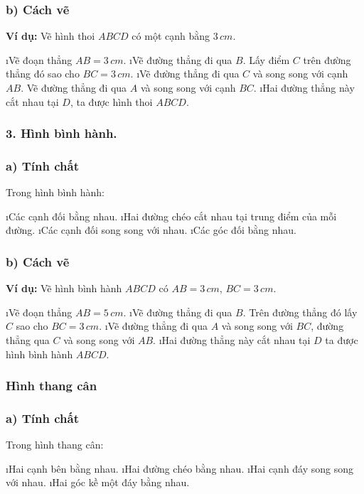 \subsubsection*{b) Cách vẽ}
\textbf{Ví dụ:} Vẽ hình thoi $ABCD$ có một cạnh bằng $3\, cm$. 
\begin{enumerate}[Bước 1:, leftmargin=*]
	\i Vẽ đoạn thẳng $AB = 3\, cm$. 
	\i Vẽ đường thẳng đi qua $B$. Lấy điểm $C$ trên đường thẳng đó sao cho $BC = 3\, cm$. 
	\i Vẽ đường thẳng đi qua $C$  và song song với cạnh $AB$. Vẽ đường thẳng đi qua $A$ và song song với cạnh $BC$. 
	\i Hai đường thẳng này cắt nhau tại  $D$, ta được hình thoi $ABCD$.
\end{enumerate} 
\subsubsection{3. Hình bình hành.}
\subsubsection*{a) Tính chất}
Trong hình bình hành:
\begin{enumerate}[--, leftmargin=*]
	\i Các cạnh đối bằng nhau.
	\i Hai đường chéo cắt nhau tại trung điểm của mỗi đường. 
	\i Các cạnh đối song song với nhau.
	\i Các góc đối bằng nhau.
\end{enumerate}
\subsubsection*{b) Cách vẽ}
\textbf{Ví dụ:} Vẽ hình bình hành $ABCD$ có $AB = 3\, cm$, $BC = 3\, cm$.
\begin{enumerate}[Bước 1:, leftmargin=*]
	\i Vẽ đoạn thẳng $AB = 5\, cm$. 
	\i Vẽ đường thẳng đi qua  $B$. Trên đường thẳng đó lấy $C$  sao cho $BC = 3 \,cm$.
	\i Vẽ đường thẳng đi qua $A$ và song song với  $BC$, đường thẳng qua $C$ và song song với $AB$.
	\i Hai đường thẳng này cắt nhau tại $D$ ta được hình bình hành $ABCD$.
\end{enumerate}
\subsubsection{Hình thang cân}
\subsubsection*{a) Tính chất}
Trong hình thang cân:
\begin{enumerate}[--, leftmargin=*]
	\i Hai cạnh bên bằng nhau. 
	\i Hai đường chéo bằng nhau.
	\i Hai cạnh đáy song song với nhau. 
	\i Hai góc kề một đáy bằng nhau.
\end{enumerate}

